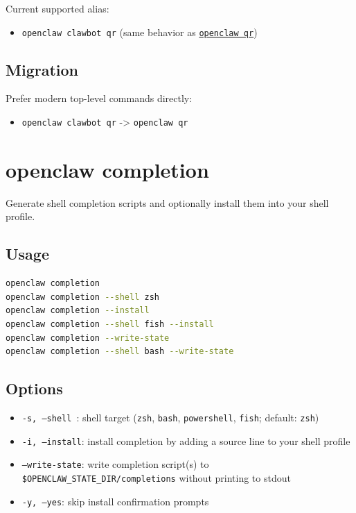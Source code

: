 Current supported alias:

\begin{itemize}
  \item \texttt{openclaw clawbot qr} (same behavior as \href{/cli/qr}{\texttt{openclaw qr}})
\end{itemize}


\subsection{Migration}


Prefer modern top-level commands directly:

\begin{itemize}
  \item \texttt{openclaw clawbot qr} -> \texttt{openclaw qr}
\end{itemize}



\clearpage

\section{openclaw completion}


Generate shell completion scripts and optionally install them into your shell profile.

\subsection{Usage}


\begin{lstlisting}[language=bash]
openclaw completion
openclaw completion --shell zsh
openclaw completion --install
openclaw completion --shell fish --install
openclaw completion --write-state
openclaw completion --shell bash --write-state
\end{lstlisting}


\subsection{Options}


\begin{itemize}
  \item \texttt{-s, --shell }: shell target (\texttt{zsh}, \texttt{bash}, \texttt{powershell}, \texttt{fish}; default: \texttt{zsh})
  \item \texttt{-i, --install}: install completion by adding a source line to your shell profile
  \item \texttt{--write-state}: write completion script(s) to \texttt{\$OPENCLAW\_STATE\_DIR/completions} without printing to stdout
  \item \texttt{-y, --yes}: skip install confirmation prompts
\end{itemize}


